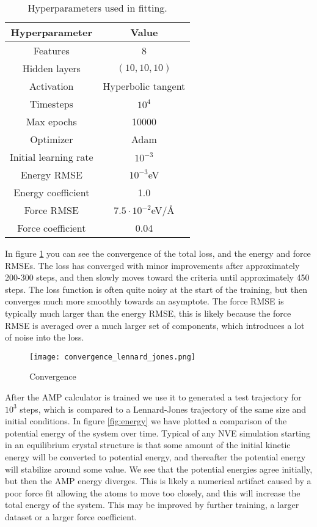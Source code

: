\begin{table}[h]
\label{tab:hyperparam}
\caption{Hyperparameters used in fitting.}
\begin{center}
\begin{tabular}{|c c|}
\hline
Hyperparameter & Value \\
\hline \hline
Features & 8 \\
Hidden layers & $(10, 10, 10)$ \\
Activation & Hyperbolic tangent \\
Timesteps & $10^4$ \\
Max epochs & 10000 \\
Optimizer & Adam \\
Initial learning rate & $10^{-3}$ \\
Energy RMSE & $10^{-3}$eV \\
Energy coefficient & 1.0 \\
Force RMSE & $7.5\cdot10^{-2}$eV/Å \\
Force coefficient & 0.04 \\
\hline
\end{tabular}
\end{center}
\end{table}

In figure \ref{fig:convergence} you can see the convergence of the total
loss, and the energy and force RMSEs. The loss has converged
with minor improvements after approximately 200-300 steps,
and then slowly moves toward the criteria until approximately 450 steps.
The loss function is often
quite noisy at the start of the training, but then converges much more
smoothly towards an asymptote. The force RMSE is typically much
larger than the energy RMSE, this is likely because the force RMSE
is averaged over a much larger set of components, which introduces
a lot of noise into the loss.

\begin{figure}[h]
    \centering
    \texttt{[image: convergence\_lennard\_jones.png]}
    \caption{Convergence}
    \label{fig:convergence}
\end{figure}

After the AMP calculator is trained we use it to generated a 
test trajectory for $10^3$ steps, which is compared to a Lennard-Jones
trajectory of the same size and initial conditions.
In figure \ref{fig:energy} we have plotted a comparison of the
potential energy of the system over time. Typical of any NVE simulation
starting in an equilibrium crystal structure is that some amount of
the initial kinetic energy will be converted to potential energy,
and thereafter the potential energy will stabilize around some value.
We see that the potential energies agree initially, but then the AMP
energy diverges. This is likely a numerical artifact caused by
a poor force fit allowing the atoms to move too closely, and
this will increase the total energy of the system.
This may be improved by further training, a larger dataset or a larger force
coefficient.
\par

